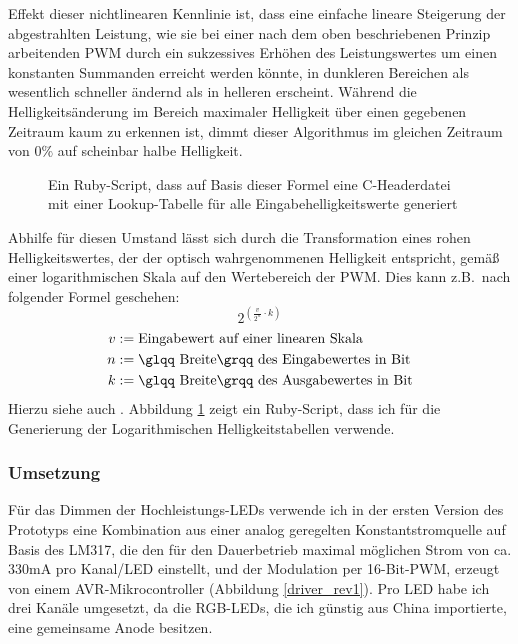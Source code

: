 \documentclass[12pt,a4paper,notitlepage]{article}
\begin{document}
Effekt dieser nichtlinearen Kennlinie ist, dass eine einfache lineare Steigerung der abgestrahlten Leistung, wie sie bei einer nach dem oben beschriebenen Prinzip arbeitenden \gls{PWM} durch ein sukzessives Erhöhen des Leistungswertes um einen konstanten Summanden erreicht werden könnte, in dunkleren Bereichen als wesentlich schneller ändernd als in helleren erscheint. Während die Helligkeitsänderung im Bereich maximaler Helligkeit über einen gegebenen Zeitraum kaum zu erkennen ist, dimmt dieser Algorithmus im gleichen Zeitraum von $0\%$ auf scheinbar halbe Helligkeit.

\begin{figure}

\label{log_lut_gen}
\caption{Ein Ruby-Script, dass auf Basis dieser Formel eine C-Headerdatei mit einer Lookup-Tabelle für alle Eingabehelligkeitswerte generiert}
\end{figure}

Abhilfe für diesen Umstand lässt sich durch die Transformation eines rohen Helligkeitswertes, der der optisch wahrgenommenen Helligkeit entspricht, gemäß einer logarithmischen Skala auf den Wertebereich der \gls{PWM}. Dies kann z.B.\ nach folgender Formel geschehen:
\begin{equation}
2^{\left(\frac{v}{2^n}\cdot k\right)}
\end{equation}
\begin{align}
v&:=\text{Eingabewert auf einer linearen Skala}\\
n&:=\text{\glqq Breite\grqq\ des Eingabewertes in Bit}\\
k&:=\text{\glqq Breite\grqq\  des Ausgabewertes in Bit}
\end{align}
Hierzu siehe auch \cite{MAXIM41,MAXIM57,SIART1}. Abbildung \ref{log_lut_gen} %
zeigt ein Ruby-Script, dass ich für die Generierung der Logarithmischen Helligkeitstabellen verwende.

\subsubsection{Umsetzung}
Für das Dimmen der Hochleistungs-LEDs verwende ich in der ersten Version des Prototyps eine Kombination aus einer analog geregelten Konstantstromquelle auf Basis des LM317\cite{NATIONAL3}, die den für den Dauerbetrieb maximal möglichen Strom von ca. 330mA pro Kanal/LED einstellt, und der Modulation per 16-Bit-PWM, erzeugt von einem AVR-Mikrocontroller (Abbildung \ref{driver_rev1}).
Pro LED habe ich drei Kanäle umgesetzt, da die RGB-LEDs, die ich günstig aus China importierte, %
eine gemeinsame Anode besitzen.
\end{document}
